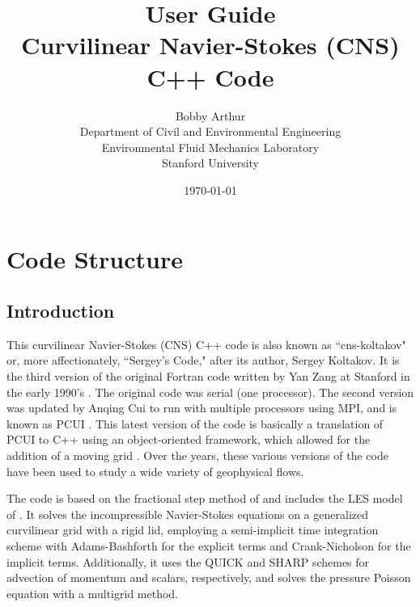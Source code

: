 \documentclass[12pt]{report}
\title{User Guide\\ \vspace{0.1in} \large{Curvilinear Navier-Stokes (CNS) C++ Code}}
\author{Bobby Arthur \\ Department of Civil and Environmental Engineering
                     \\ Environmental Fluid Mechanics Laboratory
                     \\ Stanford University}
\date{\today}
\begin{document}
\maketitle
\tableofcontents

\chapter{Code Structure}

\section{Introduction}
This curvilinear Navier-Stokes (CNS) C++ code is also known as ``cns-koltakov" or, more affectionately, ``Sergey's Code," after its author, Sergey Koltakov. It is the third version of the original Fortran code written by Yan Zang at Stanford in the early 1990's \citep{zang1994}. The original code was serial (one processor). The second version was updated by Anqing Cui to run with multiple processors using MPI, and is known as PCUI \citep{cui2001}. This latest version of the code is basically a translation of PCUI to C++ using an object-oriented framework, which allowed for the addition of a moving grid \citep{koltakov2012}. Over the years, these various versions of the code have been used to study a wide variety of geophysical flows.

The code is based on the fractional step method of \citet{zang1994} and includes the LES model of \citet{zang1993}. It solves the incompressible Navier-Stokes equations on a generalized curvilinear grid with a rigid lid, employing a semi-implicit time integration scheme with Adams-Bashforth for the explicit terms and Crank-Nicholson for the implicit terms. Additionally, it uses the QUICK and SHARP schemes for advection of momentum and scalars, respectively, and solves the pressure Poisson equation with a multigrid method. 
\end{document}
